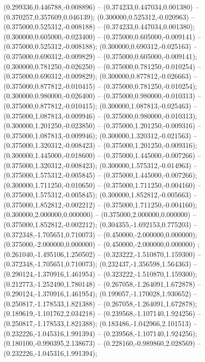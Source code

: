  (0.299336,0.446788,-0.008896) -- (0.374233,0.447034,0.001380) -- (0.370257,0.357609,0.046139);
 (0.300000,0.525312,-0.020963) -- (0.375000,0.525312,-0.008188) -- (0.374233,0.447034,0.001380);
 (0.300000,0.605000,-0.023400) -- (0.375000,0.605000,-0.009141) -- (0.375000,0.525312,-0.008188);
 (0.300000,0.690312,-0.025163) -- (0.375000,0.690312,-0.009829) -- (0.375000,0.605000,-0.009141);
 (0.300000,0.781250,-0.026250) -- (0.375000,0.781250,-0.010254) -- (0.375000,0.690312,-0.009829);
 (0.300000,0.877812,-0.026663) -- (0.375000,0.877812,-0.010415) -- (0.375000,0.781250,-0.010254);
 (0.300000,0.980000,-0.026400) -- (0.375000,0.980000,-0.010313) -- (0.375000,0.877812,-0.010415);
 (0.300000,1.087813,-0.025463) -- (0.375000,1.087813,-0.009946) -- (0.375000,0.980000,-0.010313);
 (0.300000,1.201250,-0.023850) -- (0.375000,1.201250,-0.009316) -- (0.375000,1.087813,-0.009946);
 (0.300000,1.320312,-0.021563) -- (0.375000,1.320312,-0.008423) -- (0.375000,1.201250,-0.009316);
 (0.300000,1.445000,-0.018600) -- (0.375000,1.445000,-0.007266) -- (0.375000,1.320312,-0.008423);
 (0.300000,1.575312,-0.014963) -- (0.375000,1.575312,-0.005845) -- (0.375000,1.445000,-0.007266);
 (0.300000,1.711250,-0.010650) -- (0.375000,1.711250,-0.004160) -- (0.375000,1.575312,-0.005845);
 (0.300000,1.852812,-0.005663) -- (0.375000,1.852812,-0.002212) -- (0.375000,1.711250,-0.004160);
 (0.300000,2.000000,0.000000) -- (0.375000,2.000000,0.000000) -- (0.375000,1.852812,-0.002212);
 (0.304355,-1.692153,0.775203) -- (0.372348,-1.705651,0.710073) -- (0.450000,-2.000000,0.000000);
 (0.375000,-2.000000,0.000000) -- (0.450000,-2.000000,0.000000) ;
 (0.261040,-1.495106,1.250502) -- (0.323222,-1.510870,1.159300) -- (0.372348,-1.705651,0.710073);
 (0.232437,-1.356598,1.564363) -- (0.290124,-1.370916,1.461954) -- (0.323222,-1.510870,1.159300);
 (0.212773,-1.252490,1.780148) -- (0.267058,-1.264091,1.672878) -- (0.290124,-1.370916,1.461954);
 (0.199057,-1.170028,1.930652) -- (0.250817,-1.178533,1.821388) -- (0.267058,-1.264091,1.672878);
 (0.189619,-1.101762,2.034218) -- (0.239568,-1.107140,1.924256) -- (0.250817,-1.178533,1.821388);
 (0.183486,-1.042966,2.101513) -- (0.232226,-1.045316,1.991394) -- (0.239568,-1.107140,1.924256);
 (0.180100,-0.990395,2.138673) -- (0.228160,-0.989860,2.028569) -- (0.232226,-1.045316,1.991394);
